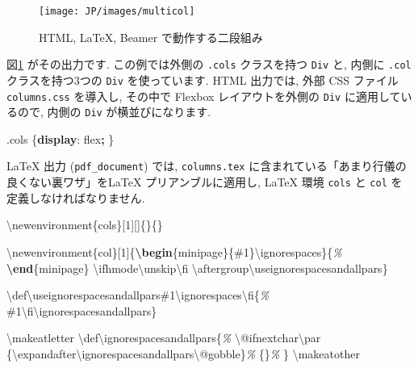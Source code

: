 \documentclass[
  11pt,
  lualatex,ja=standard,jafont=noto]{bxjsreport}
\newenvironment{Shaded}{\begin{snugshade}}{\end{snugshade}}
\newcommand{\CommentTok}[1]{\textcolor[rgb]{0.56,0.35,0.01}{\textit{#1}}}
\newcommand{\ExtensionTok}[1]{#1}
\newcommand{\FunctionTok}[1]{\textcolor[rgb]{0.00,0.00,0.00}{#1}}
\newcommand{\KeywordTok}[1]{\textcolor[rgb]{0.13,0.29,0.53}{\textbf{#1}}}
\newcommand{\NormalTok}[1]{#1}
\newcommand{\OperatorTok}[1]{\textcolor[rgb]{0.81,0.36,0.00}{\textbf{#1}}}
\begin{document}
\begin{figure}

{\centering \texttt{[image: JP/images/multicol]} 

}

\caption{HTML, LaTeX, Beamer で動作する二段組み}\label{fig:multicol}
\end{figure}

図\ref{fig:multicol} がその出力です. この例では外側の \texttt{.cols} クラスを持つ \texttt{Div} と, 内側に \texttt{.col} クラスを持つ3つの \texttt{Div} を使っています. HTML 出力では, 外部 CSS ファイル \texttt{columns.css} を導入し, その中で Flexbox レイアウトを外側の \texttt{Div} に適用しているので, 内側の \texttt{Div} が横並びになります.

\begin{Shaded}
\begin{Highlighting}[]
\FunctionTok{.cols}\NormalTok{ \{}\KeywordTok{display}\NormalTok{: flex}\OperatorTok{;}\NormalTok{ \}}
\end{Highlighting}
\end{Shaded}

LaTeX 出力 (\texttt{pdf\_document}) では, \texttt{columns.tex} に含まれている「あまり行儀の良くない裏ワザ」をLaTeX プリアンブルに適用し, LaTeX 環境 \texttt{cols} と \texttt{col} を定義しなければなりません.

\begin{Shaded}
\begin{Highlighting}[]
\FunctionTok{\textbackslash{}newenvironment}\NormalTok{\{cols\}[1][]\{\}\{\}}

\FunctionTok{\textbackslash{}newenvironment}\NormalTok{\{col\}[1]\{}\KeywordTok{\textbackslash{}begin}\NormalTok{\{}\ExtensionTok{minipage}\NormalTok{\}\{\#1\}}\FunctionTok{\textbackslash{}ignorespaces}\NormalTok{\}\{}\CommentTok{\%}
\KeywordTok{\textbackslash{}end}\NormalTok{\{}\ExtensionTok{minipage}\NormalTok{\}}
\FunctionTok{\textbackslash{}ifhmode\textbackslash{}unskip\textbackslash{}fi}
\FunctionTok{\textbackslash{}aftergroup\textbackslash{}useignorespacesandallpars}\NormalTok{\}}

\FunctionTok{\textbackslash{}def\textbackslash{}useignorespacesandallpars}\NormalTok{\#1}\FunctionTok{\textbackslash{}ignorespaces\textbackslash{}fi}\NormalTok{\{}\CommentTok{\%}
\NormalTok{\#1}\FunctionTok{\textbackslash{}fi\textbackslash{}ignorespacesandallpars}\NormalTok{\}}

\FunctionTok{\textbackslash{}makeatletter}
\FunctionTok{\textbackslash{}def\textbackslash{}ignorespacesandallpars}\NormalTok{\{}\CommentTok{\%}
  \FunctionTok{\textbackslash{}@ifnextchar\textbackslash{}par}
\NormalTok{    \{}\FunctionTok{\textbackslash{}expandafter\textbackslash{}ignorespacesandallpars\textbackslash{}@gobble}\NormalTok{\}}\CommentTok{\%}
\NormalTok{    \{\}}\CommentTok{\%}
\NormalTok{\}}
\FunctionTok{\textbackslash{}makeatother}
\end{Highlighting}
\end{Shaded}
\end{document}
